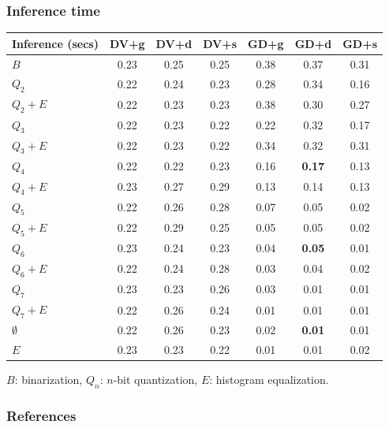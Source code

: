 \documentclass{beamer}
\begin{document}
\begin{frame}
  \frametitle{Inference time}
  \footnotesize
  \begin{table}[h]
    \centering
    \begin{tabular}{l|c|c|c|c|c|c}
      \hline
      \multicolumn{1}{c}{\bfseries Inference (secs)} & \multicolumn{1}{c}{\bfseries DV+g} &
      \multicolumn{1}{c}{\bfseries DV+d} & \multicolumn{1}{c}{\bfseries DV+s} &
      \multicolumn{1}{c}{\bfseries GD+g} & \multicolumn{1}{c}{\bfseries GD+d} &
      \multicolumn{1}{c}{\bfseries GD+s}\\
      \hline
      $B$         & 0.23 & 0.25 & 0.25 & 0.38 & 0.37 & 0.31 \\
      $Q_2$       & 0.22 & 0.24 & 0.23 & 0.28 & 0.34 & 0.16 \\
      $Q_2+E$     & 0.22 & 0.23 & 0.23 & 0.38 & 0.30 & 0.27 \\
      $Q_3$       & 0.22 & 0.23 & 0.22 & 0.22 & 0.32 & 0.17 \\
      $Q_3+E$     & 0.22 & 0.23 & 0.22 & 0.34 & 0.32 & 0.31 \\
      $Q_4$       & 0.22 & 0.22 & 0.23 & 0.16 & \textbf{0.17} & 0.13 \\
      $Q_4+E$     & 0.23 & 0.27 & 0.29 & 0.13 & 0.14 & 0.13 \\
      $Q_5$       & 0.22 & 0.26 & 0.28 & 0.07 & 0.05 & 0.02 \\
      $Q_5+E$     & 0.22 & 0.29 & 0.25 & 0.05 & 0.05 & 0.02 \\
      $Q_6$       & 0.23 & 0.24 & 0.23 & 0.04 & \textbf{0.05} & 0.01 \\
      $Q_6+E$     & 0.22 & 0.24 & 0.28 & 0.03 & 0.04 & 0.02 \\
      $Q_7$       & 0.23 & 0.23 & 0.26 & 0.03 & 0.01 & 0.01 \\
      $Q_7+E$     & 0.22 & 0.26 & 0.24 & 0.01 & 0.01 & 0.01 \\
      $\emptyset$ & 0.22 & 0.26 & 0.23 & 0.02 & \textbf{0.01} & 0.01 \\
      $E$         & 0.23 & 0.23 & 0.22 & 0.01 & 0.01 & 0.02 \\
    \end{tabular}
  \end{table}

  \begin{center}
    $B$: binarization, $Q_n$: $n$-bit quantization, $E$: histogram equalization.
  \end{center}
\end{frame}

\begin{frame}[t,allowframebreaks]
  \frametitle{References}
  \printbibliography[heading=none]
  \nocite{*}
\end{frame}
\end{document}
